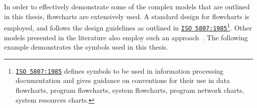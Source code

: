 \begin{preamble}
In order to effectively demonstrate some of the complex models that are outlined in this thesis, flowcharts are extensively used. A standard design for flowcharts is employed, and follows the design guidelines as outlined in \href{https://www.iso.org/standard/11955.html}{\texttt{ISO 5807:1985}}\footnote{\href{https://www.iso.org/standard/11955.html}{\texttt{ISO 5807:1985}} defines symbols to be used in information processing documentation and gives guidance on conventions for their use in data flowcharts, program flowcharts, system flowcharts, program network charts, system resources charts.}. Other models presented in the literature also employ such an approach~\citep{thomas2014modelling_behaviour}. The following example demonstrates the symbols used in this thesis.

\begin{figure}[h!]
    \centering
\end{figure}


\end{preamble}
